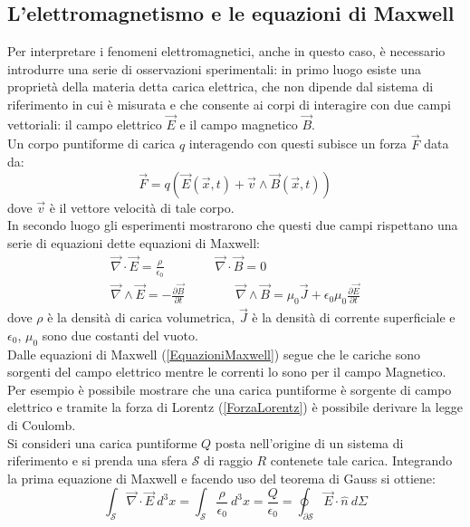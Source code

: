 \subsection{L'elettromagnetismo e le equazioni di Maxwell}\label{sec:EquazioniMaxwell}
Per interpretare i fenomeni elettromagnetici, anche in questo caso, è necessario introdurre
una serie di osservazioni sperimentali: in primo luogo esiste una proprietà della materia 
detta carica elettrica, che non dipende dal sistema di riferimento in cui è misurata e che consente 
ai corpi di interagire con due campi vettoriali: 
il campo elettrico $\vec{E}$ e il campo magnetico $\vec{B}$.\\ Un corpo puntiforme di carica 
$q$ interagendo con questi subisce un forza $\vec{F}$ data da:
\begin{equation}
	\vec{F}=q(\vec{E}(\vec{x},t)+\vec{v}\wedge\vec{B}(\vec{x},t))
	\label{ForzaLorentz}
\end{equation}
dove $\vec{v}$ è il vettore velocità di tale corpo.\\
In secondo luogo gli esperimenti mostrarono che questi due campi rispettano una serie di equazioni 
dette equazioni di Maxwell:
\begin{equation}
	\begin{gathered}
		\vec{\nabla}\cdot\vec{E}=\frac{\rho}{\epsilon_0} \qquad \qquad \vec{\nabla}\cdot\vec{B}=0 \\
		\vec{\nabla}\wedge\vec{E}=-\frac{\partial\vec{B}}{\partial t} \qquad \qquad \vec{\nabla}\wedge
		\vec{B}=\mu_0\vec{J}+\epsilon_0\mu_0\frac{\partial\vec{E}}{\partial t}
		\label{EquazioniMaxwell}
	\end{gathered}
\end{equation}
dove $\rho$ è la densità di carica volumetrica, $\vec{J}$ è la densità di corrente superficiale e 
$\epsilon_0$, $\mu_0$ sono due costanti del vuoto.\\
Dalle equazioni di Maxwell (\ref{EquazioniMaxwell}) segue che le cariche sono sorgenti del campo 
elettrico mentre le correnti lo sono per 
il campo Magnetico. Per esempio è possibile mostrare che una carica puntiforme è sorgente di campo elettrico e 
tramite la forza di Lorentz (\ref{ForzaLorentz}) è possibile derivare la legge di Coulomb.\\
Si consideri una carica puntiforme $Q$ posta nell'origine di un sistema di riferimento e si prenda una sfera $\mathcal{S}$ di raggio $R$ 
contenete tale carica. Integrando la prima equazione di Maxwell e facendo uso del teorema di Gauss si ottiene:
\begin{equation*}
	\int_\mathcal{S}\vec{\nabla}\cdot\vec{E}\ d^3x=\int_\mathcal{S}\frac{\rho}{\epsilon_0}\ d^3x=\frac{Q}{\epsilon_0}=\oint_{\partial\mathcal{S}}\vec{E}\cdot\hat{n}\ d\Sigma
\end{equation*}
